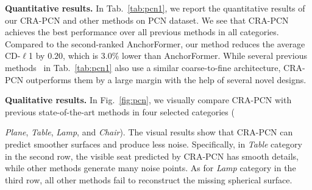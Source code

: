 \documentclass[letterpaper]{article} %
\begin{document}
{\bf Quantitative results.}
In Tab.~\ref{tab:pcn1}, we report the quantitative results of our CRA-PCN and other methods on PCN dataset.
We see that CRA-PCN achieves the best performance over all previous methods in all categories.
Compared to the second-ranked AnchorFormer, our method reduces the average CD-$\ell$1 by $0.20$, which is $3.0\%$ lower than AnchorFormer.
While several previous methods~\cite{xiang2021snowflakenet, zhou2022seedformer,yan2022fbnet} in Tab.~\ref{tab:pcn1} also use a similar coarse-to-fine architecture, CRA-PCN outperforms them by a large margin with the help of several novel designs.

{ \bf Qualitative results.}
In Fig.~\ref{fig:pcn}, we visually compare CRA-PCN with previous state-of-the-art methods in four selected categories ({{\em Plane}, {\em Table}, {\em Lamp}, and {\em Chair}).
 The visual results show that CRA-PCN can predict smoother surfaces and produce less noise.
Specifically, in \textit{Table} category in the second row, the visible seat predicted by CRA-PCN has  smooth details, while other methods generate many noise points.
 As for \textit{Lamp} category in the third row, all other methods fail to reconstruct the missing spherical surface.

\begin{table}[!t]
\begin{center}
\end{center}
\caption{Results on ShapeNet-34 in terms of  L2 Chamfer Distance $\times$ $10^3$ (lower is better). } \label{tab:shapenet34}
\end{table}

}
\end{document}
